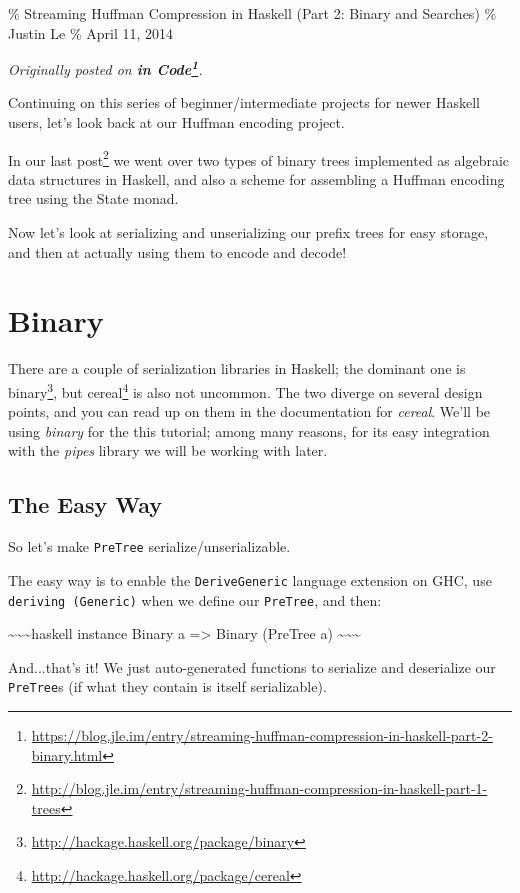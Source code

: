 \documentclass[]{article}
\renewcommand{\href}[2]{#2\footnote{\url{#1}}}
\begin{document}
\% Streaming Huffman Compression in Haskell (Part 2: Binary and Searches) \%
Justin Le \% April 11, 2014

\emph{Originally posted on
\textbf{\href{https://blog.jle.im/entry/streaming-huffman-compression-in-haskell-part-2-binary.html}{in
Code}}.}

Continuing on this series of beginner/intermediate projects for newer Haskell
users, let's look back at our Huffman encoding project.

In our
\href{http://blog.jle.im/entry/streaming-huffman-compression-in-haskell-part-1-trees}{last
post} we went over two types of binary trees implemented as algebraic data
structures in Haskell, and also a scheme for assembling a Huffman encoding tree
using the State monad.

Now let's look at serializing and unserializing our prefix trees for easy
storage, and then at actually using them to encode and decode!

\section{Binary}

There are a couple of serialization libraries in Haskell; the dominant one is
\href{http://hackage.haskell.org/package/binary}{binary}, but
\href{http://hackage.haskell.org/package/cereal}{cereal} is also not uncommon.
The two diverge on several design points, and you can read up on them in the
documentation for \emph{cereal}. We'll be using \emph{binary} for the this
tutorial; among many reasons, for its easy integration with the \emph{pipes}
library we will be working with later.

\subsection{The Easy Way}

So let's make \texttt{PreTree} serialize/unserializable.

The easy way is to enable the \texttt{DeriveGeneric} language extension on GHC,
use \texttt{deriving\ (Generic)} when we define our \texttt{PreTree}, and then:

\textasciitilde{}\textasciitilde{}\textasciitilde{}haskell instance Binary a
=\textgreater{} Binary (PreTree a)
\textasciitilde{}\textasciitilde{}\textasciitilde{}

And...that's it! We just auto-generated functions to serialize and deserialize
our \texttt{PreTree}s (if what they contain is itself serializable).
\end{document}
